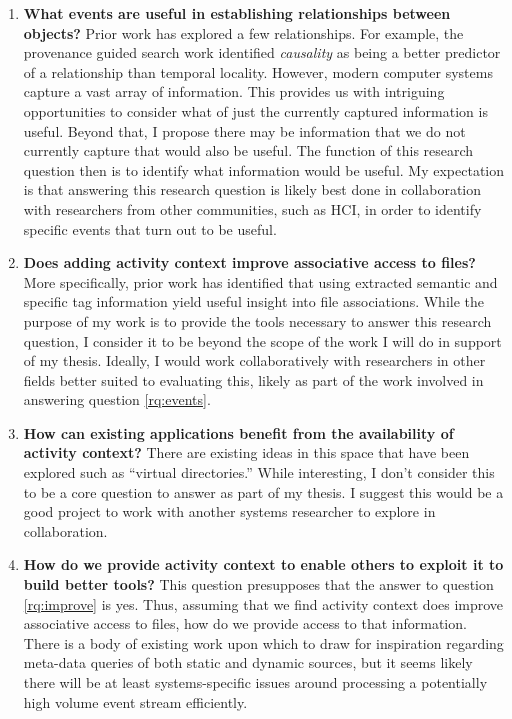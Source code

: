 \begin{enumerate}
    \item\label{rq:events} \textbf{What events are useful in establishing relationships between
        objects?}  Prior work has explored a few relationships.  For example, the
    provenance guided search work identified \emph{causality} as being a better
    predictor of a relationship than temporal locality.  However, modern
    computer systems capture a vast array of information.  This provides us with
    intriguing opportunities to consider what of just the currently captured
    information is useful.  Beyond that, I propose there may be information that
    we do not currently capture that would also be useful.  The function of this
    research question then is to identify what information would be useful.
    My expectation is that answering this research question is likely best done
    in collaboration with researchers from other communities, such as HCI, in
    order to identify specific events that turn out to be useful.

    \item\label{rq:improve} \textbf{Does adding activity context improve associative access to
        files?}  More specifically, prior work has identified that using extracted
    semantic and specific tag information yield useful insight into file
    associations.  While the purpose of my work is to provide the tools
    necessary to answer this research question, I consider it to be beyond the
    scope of the work I will do in support of my thesis.  Ideally, I would work
    collaboratively with researchers in other fields better suited to evaluating
    this, likely as part of the work involved in answering question
    \ref{rq:events}.

    \item \label{rq:existing-apps} \textbf{How can existing applications benefit from the availability of
              activity context?} There are existing ideas in this space that have been
          explored such as ``virtual directories.'' While interesting, I don't
          consider this to be a core question to answer as part of my thesis.  I
          suggest this would be a good project to work with another systems researcher
          to explore in collaboration.

    \item \label{rq:providing-ac} \textbf{How do we provide activity context to enable others to exploit
              it to build better tools?}  This question presupposes that the answer to
          question \ref{rq:improve} is yes.  Thus, assuming that we find activity
          context does improve associative access to files, how do we provide access
          to that information.  There is a body of existing work upon which to draw
          for inspiration regarding meta-data queries of both static and dynamic
          sources, but it seems likely there will be at least systems-specific issues around
          processing a potentially high volume event stream efficiently.


\end{enumerate}
